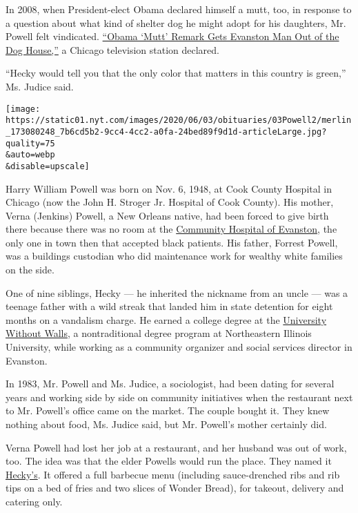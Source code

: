 In 2008, when President-elect Obama declared himself a mutt, too, in
response to a question about what kind of shelter dog he might adopt for
his daughters, Mr. Powell felt vindicated.
\href{https://www.nbcchicago.com/news/local/obama-mutt-remark-gets-evanston-man-out-of-the-dog-house/1845081/}{``Obama
`Mutt' Remark Gets Evanston Man Out of the Dog House,''} a Chicago
television station declared.

``Hecky would tell you that the only color that matters in this country
is green,'' Ms. Judice said.

\texttt{[image: https://static01.nyt.com/images/2020/06/03/obituaries/03Powell2/merlin\_173080248\_7b6cd5b2-9cc4-4cc2-a0fa-24bed89f9d1d-articleLarge.jpg?quality=75\\\&auto=webp\\\&disable=upscale]}

Harry William Powell was born on Nov. 6, 1948, at Cook County Hospital
in Chicago (now the John H. Stroger Jr. Hospital of Cook County). His
mother, Verna (Jenkins) Powell, a New Orleans native, had been forced to
give birth there because there was no room at the
\href{https://dailynorthwestern.com/2000/04/13/archive-manual/exhibit-explores-citys-history-of-segregation/}{Community
Hospital of Evanston}, the only one in town then that accepted black
patients. His father, Forrest Powell, was a buildings custodian who did
maintenance work for wealthy white families on the side.

One of nine siblings, Hecky --- he inherited the nickname from an uncle
--- was a teenage father with a wild streak that landed him in state
detention for eight months on a vandalism charge. He earned a college
degree at the
\href{https://www.neiu.edu/academics/nontraditional-degree-programs/university-without-walls}{University
Without Walls}, a nontraditional degree program at Northeastern Illinois
University, while working as a community organizer and social services
director in Evanston.

In 1983, Mr. Powell and Ms. Judice, a sociologist, had been dating for
several years and working side by side on community initiatives when the
restaurant next to Mr. Powell's office came on the market. The couple
bought it. They knew nothing about food, Ms. Judice said, but Mr.
Powell's mother certainly did.

Verna Powell had lost her job at a restaurant, and her husband was out
of work, too. The idea was that the elder Powells would run the place.
They named it \href{https://www.heckys.com}{Hecky's}. It offered a full
barbecue menu (including sauce-drenched ribs and rib tips on a bed of
fries and two slices of Wonder Bread), for takeout, delivery and
catering only.

